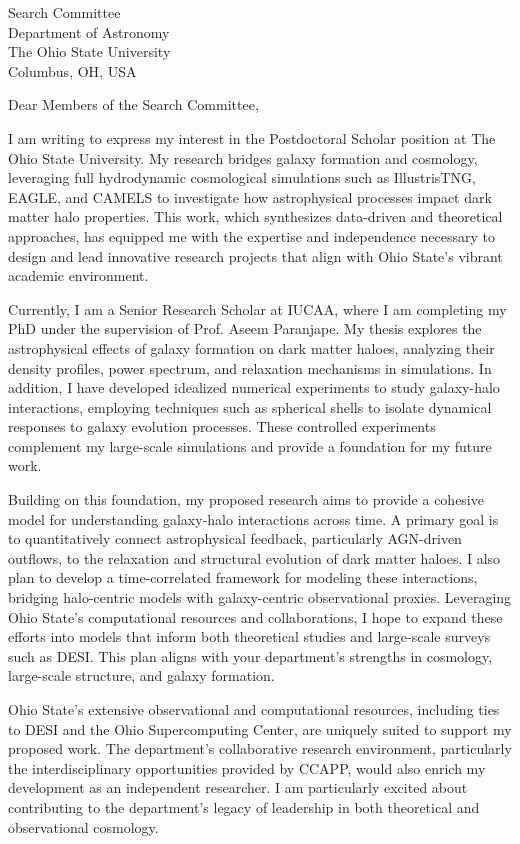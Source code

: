 \documentclass[11pt]{letter}
\begin{document}
\begin{letter}{Search Committee \\ Department of Astronomy \\ The Ohio State University \\ Columbus, OH, USA}

\opening{Dear Members of the Search Committee,}

I am writing to express my interest in the Postdoctoral Scholar position at The Ohio State University. My research bridges galaxy formation and cosmology, leveraging full hydrodynamic cosmological simulations such as IllustrisTNG, EAGLE, and CAMELS to investigate how astrophysical processes impact dark matter halo properties. This work, which synthesizes data-driven and theoretical approaches, has equipped me with the expertise and independence necessary to design and lead innovative research projects that align with Ohio State’s vibrant academic environment.

Currently, I am a Senior Research Scholar at IUCAA, where I am completing my PhD under the supervision of Prof. Aseem Paranjape. My thesis explores the astrophysical effects of galaxy formation on dark matter haloes, analyzing their density profiles, power spectrum, and relaxation mechanisms in simulations. In addition, I have developed idealized numerical experiments to study galaxy-halo interactions, employing techniques such as spherical shells to isolate dynamical responses to galaxy evolution processes. These controlled experiments complement my large-scale simulations and provide a foundation for my future work.

Building on this foundation, my proposed research aims to provide a cohesive model for understanding galaxy-halo interactions across time. A primary goal is to quantitatively connect astrophysical feedback, particularly AGN-driven outflows, to the relaxation and structural evolution of dark matter haloes. I also plan to develop a time-correlated framework for modeling these interactions, bridging halo-centric models with galaxy-centric observational proxies. Leveraging Ohio State’s computational resources and collaborations, I hope to expand these efforts into models that inform both theoretical studies and large-scale surveys such as DESI. This plan aligns with your department’s strengths in cosmology, large-scale structure, and galaxy formation.

Ohio State’s extensive observational and computational resources, including ties to DESI and the Ohio Supercomputing Center, are uniquely suited to support my proposed work. The department’s collaborative research environment, particularly the interdisciplinary opportunities provided by CCAPP, would also enrich my development as an independent researcher. I am particularly excited about contributing to the department's legacy of leadership in both theoretical and observational cosmology.


\end{letter}
\end{document}
